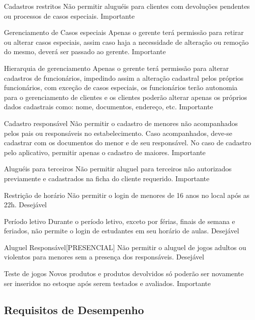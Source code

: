 \documentclass{article}
\begin{document}
  \begin{nonfunctional}
    \requirement
    {Cadastros restritos}
    {Não permitir aluguéis para clientes com devoluções pendentes ou processos de casos especiais.}
    {Importante}
    
    \requirement
    {Gerenciamento de Casos especiais}
    {Apenas o gerente terá permissão para retirar ou alterar casos especiais, assim caso haja a necessidade de alteração ou remoção do mesmo, deverá ser passado ao gerente.}
    {Importante}
    
    \requirement
    {Hierarquia de gerenciamento}
    {Apenas o gerente terá permissão para alterar cadastros de funcionários, impedindo assim a alteração cadastral pelos próprios funcionários, com exceção de casos especiais, os funcionários terão autonomia para o gerenciamento de clientes e os clientes poderão alterar apenas os próprios dados cadastrais como: nome, documentos, endereço, etc.}
    {Importante}
    
    \requirement
    {Cadastro responsável}
    {Não permitir o cadastro de menores não acompanhados pelos pais ou responsáveis no estabelecimento. Caso acompanhados, deve-se cadastrar com os documentos do menor e de seu responsável.
    No caso de cadastro pelo aplicativo, permitir apenas o cadastro de maiores.}
    {Importante}

    \requirement
    {Aluguéis para terceiros}
    {Não permitir aluguel para terceiros não autorizados previamente e cadastrados na ficha do cliente requerido.}
    {Importante}

    \requirement
    {Restrição de horário}
    {Não permitir o login de menores de 16 anos no local após as 22h.}
    {Desejável}
    
    \requirement
    {Período letivo}
    {Durante o período letivo, exceto por férias, finais de semana e feriados, não permite o login de estudantes em seu horário de aulas.}
    {Desejável}
    
    \requirement
    {Aluguel Responsável[PRESENCIAL]}
    {Não permitir o aluguel de jogos adultos ou violentos para menores sem a presença dos responsáveis.}
    {Desejável}
    
    \requirement
    {Teste de jogos}
    {Novos produtos e produtos devolvidos só poderão ser novamente ser inseridos no estoque após serem testados e avaliados.}
    {Importante}
    
  \end{nonfunctional}
    \subsection{Requisitos de Desempenho}
                    
\end{document}
